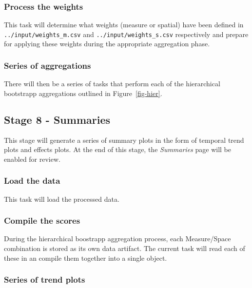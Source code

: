 \documentclass[
  8pt,
  a4paper]{article}
\begin{document}
\subsubsection{Process the weights}\label{process-the-weights}

This task will determine what weights (measure or spatial) have been
defined in \texttt{../input/weights\_m.csv} and
\texttt{../input/weights\_s.csv} respectively and prepare for applying
these weights during the appropriate aggregation phase.

\subsubsection{Series of aggregations}\label{series-of-aggregations}

There will then be a series of tasks that perform each of the
hierarchical bootstrapp aggregations outlined in Figure~\ref{fig-hier}.

\subsection{Stage 8 - Summaries}\label{stage-8---summaries}

This stage will generate a series of summary plots in the form of
temporal trend plots and effects plots. At the end of this stage, the
\emph{Summaries} page will be enabled for review.

\subsubsection{Load the data}\label{load-the-data-1}

This task will load the processed data.

\subsubsection{Compile the scores}\label{compile-the-scores}

During the hierarchical boostrapp aggregation process, each
Measure/Space combination is stored as its own data artifact. The
current task will read each of these in an compile them together into a
single object.

\subsubsection{Series of trend plots}\label{series-of-trend-plots}
\end{document}
